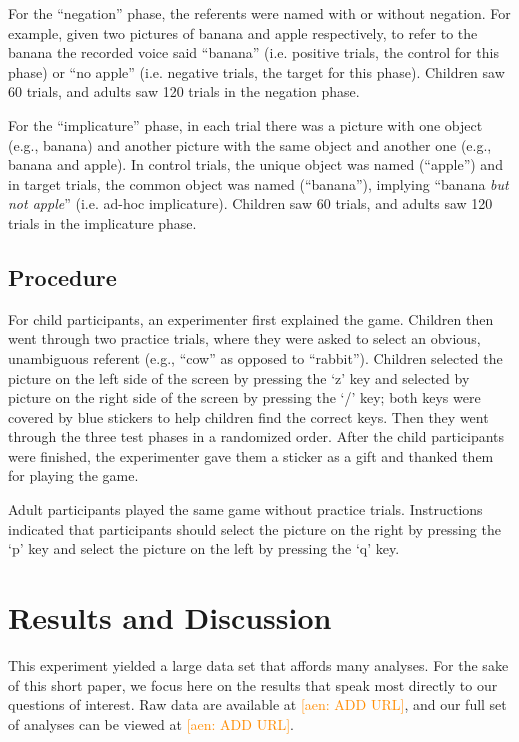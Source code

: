 \documentclass[10pt,letterpaper]{article}
\newcommand{\aen}[1]{\textcolor{DarkOrange}{[aen: #1]}}
\begin{document}
For the ``negation'' phase, the referents were named with or without negation. For example, given two pictures of banana and apple respectively, to refer to the banana the recorded voice said ``banana'' (i.e. positive trials, the control for this phase) or ``no apple'' (i.e. negative trials, the target for this phase). Children saw 60 trials, and adults saw 120 trials in the negation phase. 

For the ``implicature'' phase, in each trial there was a picture with one object (e.g., banana) and another picture with the same object and another one (e.g., banana and apple). In control trials, the unique object was named (``apple'') and in target trials, the common object was named (``banana''), implying ``banana \emph{but not apple}'' (i.e. ad-hoc implicature). Children saw 60 trials, and adults saw 120 trials in the implicature phase.  

\subsection{Procedure}

For child participants, an experimenter first explained the game.  Children then went through two practice trials, where they were asked to select an obvious, unambiguous referent (e.g., ``cow'' as opposed to ``rabbit'').  Children selected the picture on the left side of the screen by pressing the `z' key and selected by picture on the right side of the screen by pressing the `/' key; both keys were covered by blue stickers to help children find the correct keys. Then they went through the three test phases in a randomized order.  After the child participants were finished, the experimenter gave them a sticker as a gift and thanked them for playing the game.

Adult participants played the same game without practice trials.  Instructions indicated that participants should select the picture on the right by pressing the `p' key and select the picture on the left by pressing the `q' key.  

\section{Results and Discussion}

This experiment yielded a large data set that affords many analyses.  For the sake of this short paper, we focus here on the results that speak most directly to our questions of interest.  Raw data are available at \aen{ADD URL}, and our full set of analyses can be viewed at \aen{ADD URL}.  
\end{document}

